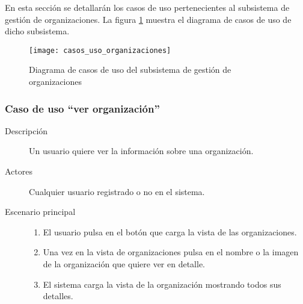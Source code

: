 En esta sección se detallarán los casos de uso pertenecientes al subsistema de gestión de organizaciones. La figura \ref{fig:casos_uso_subsistema_organizaciones} muestra el diagrama de casos de uso de dicho subsistema.

\begin{figure}[h]
\centering
\texttt{[image: casos\_uso\_organizaciones]}
\caption{Diagrama de casos de uso del subsistema de gestión de organizaciones}
\label{fig:casos_uso_subsistema_organizaciones}
\end{figure}


\subsubsection{Caso de uso ``ver organización''}
\begin{description}
\item[Descripción] Un usuario quiere ver la información sobre una organización.
\item[Actores] Cualquier usuario registrado o no en el sistema.
\item[Escenario principal] 	\hfill
							\begin{enumerate}
							\item El usuario pulsa en el botón que carga la vista de las organizaciones.
							\item Una vez en la vista de organizaciones pulsa en el nombre o la imagen de la organización que quiere ver en detalle.
							\item El sistema carga la vista de la organización mostrando todos sus detalles.
							\end{enumerate}
\end{description}


